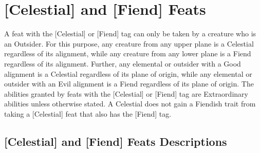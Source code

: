 \section{[Celestial] and [Fiend] Feats}

A feat with the [Celestial] or [Fiend] tag can only be taken by a creature who is an Outsider. For this purpose, any creature from any upper plane is a Celestial regardless of its alignment, while any creature from any lower plane is a Fiend regardless of its alignment. Further, any elemental or outsider with a Good alignment is a Celestial regardless of its plane of origin, while any elemental or outsider with an Evil alignment is a Fiend regardless of its plane of origin. The abilities granted by feats with the [Celestial] or [Fiend] tag are Extraordinary abilities unless otherwise stated. A Celestial does not gain a Fiendish trait from taking a [Celestial] feat that also has the [Fiend] tag.
\vspace*{\baselineskip}

\subsection{[Celestial] and [Fiend] Feats Descriptions}































